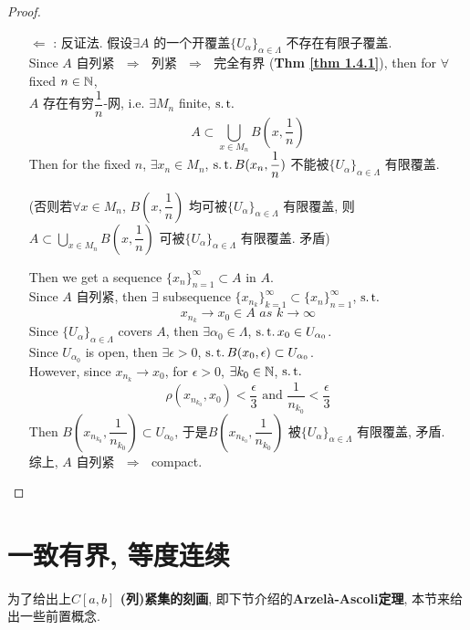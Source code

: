 \begin{thm}
\begin{proof}
\begin{enumerate}
				\item[$\Leftarrow$]: 反证法. 假设$\exists A$ 的一个开覆盖$\{ U_\alpha \}_{\alpha \in \Lambda}$ 不存在有限子覆盖. \\
				Since $A$ 自列紧 $\,\, \Rightarrow \,\,$ 列紧 $\,\, \Rightarrow \,\,$ 完全有界 (\textbf{Thm \ref{thm 1.4.1}}), then for $\forall$ fixed $n \in \mathbb{N}$, \\
				$A$ 存在有穷$\dfrac{1}{n}$-网, i.e. $\exists M_n$ finite, $\operatorname{s.t.}$
				\[ A \subset \bigcup_{x \in M_n} B(x , \frac{1}{n}) \]
				Then for the fixed $n$, $\exists x_n \in M_n$, $\operatorname{s.t.} B(x_n , \dfrac{1}{n})$ 不能被$\{ U_\alpha \}_{\alpha \in \Lambda}$ 有限覆盖.
				\begin{center}
					(否则若$\forall x \in M_n$, $B(x , \dfrac{1}{n})$ 均可被$\{ U_\alpha \}_{\alpha \in \Lambda}$ 有限覆盖, 则$A \subset \bigcup_{x \in M_n} B(x , \dfrac{1}{n})$ 可被$\{ U_\alpha \}_{\alpha \in \Lambda}$ 有限覆盖. 矛盾)
				\end{center}
				Then we get a sequence $\{ x_n \}_{n = 1}^{\infty} \subset A$ in $A$. \\
				Since $A$ 自列紧, then $\exists$ subsequence $\{ x_{n_k} \}_{k = 1}^{\infty} \subset \{ x_n \}_{n = 1}^{\infty}$, $\operatorname{s.t.}$
				\[ x_{n_k} \to x_0 \in A \,\, as \,\, k \to \infty \]
				Since $\{ U_\alpha \}_{\alpha \in \Lambda}$ covers $A$, then $\exists \alpha_0 \in \Lambda$, $\operatorname{s.t.} x_0 \in U_{\alpha_0}$. \\
				Since $U_{\alpha_0}$ is open, then $\exists \epsilon > 0$, $\operatorname{s.t.} B(x_0 , \epsilon) \subset U_{\alpha_0}$. \\
				However, since $x_{n_k} \to x_0$, for $\epsilon > 0$, $\exists k_0 \in \mathbb{N}$, $\operatorname{s.t.}$
				\[ \rho(x_{n_{k_0}} , x_0) < \frac{\epsilon}{3} \,\, \text{and} \,\, \frac{1}{n_{k_0}} < \frac{\epsilon}{3} \]
				Then $B(x_{n_{k_0}} , \dfrac{1}{n_{k_0}}) \subset U_{\alpha_0}$, 于是$B(x_{n_{k_0}} , \dfrac{1}{n_{k_0}})$ 被$\{ U_\alpha \}_{\alpha \in \Lambda}$ 有限覆盖, 矛盾. \\
				综上, $A$ 自列紧 $\,\, \Rightarrow \,\,$ compact.
			\end{enumerate}
		\end{proof}
	\end{thm}

\newpage

\section{一致有界, 等度连续}
	为了给出上\textbf{$C[a , b]$ (列)紧集的刻画}, 即下节介绍的\textbf{Arzel\`{a}-Ascoli定理}, 本节来给出一些前置概念.
